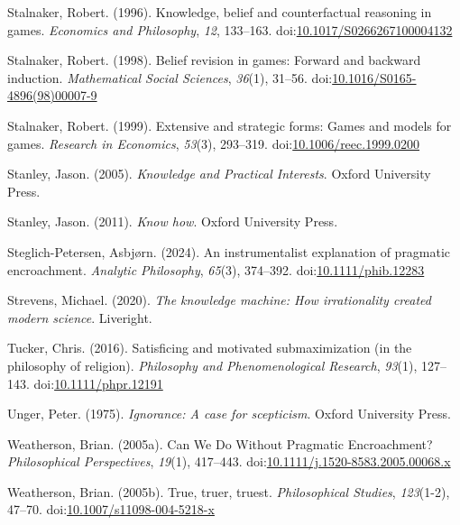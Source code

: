 \documentclass[
  10pt,
  letterpaper,
  twoside]{scrbook}
\newlength{\cslhangindent}
\newenvironment{CSLReferences}[2] %
 {\begin{list}{}{%
  \setlength{\itemindent}{0pt}
  \setlength{\leftmargin}{0pt}
  \setlength{\parsep}{0pt}
  \ifodd #1
   \setlength{\leftmargin}{\cslhangindent}
   \setlength{\itemindent}{-1\cslhangindent}
  \fi
  \setlength{\itemsep}{#2\baselineskip}}}
 {\end{list}}
\begin{document}
\begin{CSLReferences}{1}{0}
Stalnaker, Robert. (1996). Knowledge, belief and counterfactual
reasoning in games. \emph{Economics and Philosophy}, \emph{12},
133--163.
doi:\href{https://doi.org/10.1017/S0266267100004132}{10.1017/S0266267100004132}

Stalnaker, Robert. (1998). Belief revision in games: Forward and
backward induction. \emph{Mathematical Social Sciences}, \emph{36}(1),
31--56.
doi:\href{https://doi.org/10.1016/S0165-4896(98)00007-9}{10.1016/S0165-4896(98)00007-9}

Stalnaker, Robert. (1999). Extensive and strategic forms: Games and
models for games. \emph{Research in Economics}, \emph{53}(3), 293--319.
doi:\href{https://doi.org/10.1006/reec.1999.0200}{10.1006/reec.1999.0200}

Stanley, Jason. (2005). \emph{{Knowledge and Practical Interests}}.
Oxford University Press.

Stanley, Jason. (2011). \emph{Know how}. Oxford University Press.

Steglich-Petersen, Asbjørn. (2024). An instrumentalist explanation of
pragmatic encroachment. \emph{Analytic Philosophy}, \emph{65}(3),
374--392.
doi:\href{https://doi.org/10.1111/phib.12283}{10.1111/phib.12283}

Strevens, Michael. (2020). \emph{The knowledge machine: How
irrationality created modern science}. Liveright.

Tucker, Chris. (2016). Satisficing and motivated submaximization (in the
philosophy of religion). \emph{Philosophy and Phenomenological
Research}, \emph{93}(1), 127--143.
doi:\href{https://doi.org/10.1111/phpr.12191}{10.1111/phpr.12191}

Unger, Peter. (1975). \emph{Ignorance: A case for scepticism}. Oxford
University Press.

Weatherson, Brian. (2005a). {Can We Do Without Pragmatic Encroachment?}
\emph{Philosophical Perspectives}, \emph{19}(1), 417--443.
doi:\href{https://doi.org/10.1111/j.1520-8583.2005.00068.x}{10.1111/j.1520-8583.2005.00068.x}

Weatherson, Brian. (2005b). True, truer, truest. \emph{Philosophical
Studies}, \emph{123}(1-2), 47--70.
doi:\href{https://doi.org/10.1007/s11098-004-5218-x}{10.1007/s11098-004-5218-x}


\end{CSLReferences}
\end{document}
